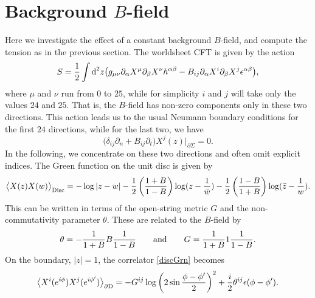 \documentclass[letterpaper,12pt]{article}
\newcommand{\td}{\textup{d}}
\begin{document}

\newcommand{\kn}{k_\sharp}
\newcommand{\kb}{k_\flat}

\section{Background $B$-field}
\label{Bfield}

Here we investigate the effect of a constant background $B$-field, and compute
the tension as in the previous section.
The worldsheet CFT is given by the action~\cite{SW}
\begin{equation}
\label{Baction}
S=\frac12\int \td^2z \big(g_{\mu\nu}\partial_\alpha X^\mu\partial_\beta X^\nu h^{\alpha\beta}
    -B_{ij}\partial_\alpha X^i\partial_\beta X^j \epsilon^{\alpha\beta}
    \big)
,\end{equation}
where $\mu$ and $\nu$ run from $0$ to $25$, while for simplicity $i$ and $j$ will
take only the values $24$ and $25$. That is, the $B$-field has non-zero components only
in these two directions.
This action leads us to the usual Neumann boundary conditions for the first $24$ directions, while for the last two, we have
\begin{equation}
\label{ncbc} 
\big(\delta_{ij}\partial_n + B_{ij}\partial_t \big)X^j(z)\bigg|_{\partial\Sigma}=0
.\end{equation}
In the following, we concentrate on these two directions and often omit explicit indices.
The Green function on the unit disc is given by
\begin{equation}
\label{discGrn}
\big\langle X(z)X(w) \big\rangle_{\textup{Disc}} = -\log |z-w|
   -\frac12\left(\frac{1+B}{1-B}\right)\log (z-\frac1{\bar{w}})
   -\frac12\left(\frac{1-B}{1+B}\right)\log ({\bar{z}}-\frac1w)
.\end{equation}
This can be written \cite{SW} in terms of the open-string metric $G$ and the 
non-commutativity parameter $\theta$. These are related to the $B$-field by 
\begin{equation}
\label{GB}
\theta=-\frac1{1+B} B \frac1{1-B} \qquad \textup{and} \qquad G=\frac1{1+B}1\frac1{1-B}
.\end{equation}
On the boundary, $|z|=1$, the correlator \eqref{discGrn} becomes
\begin{equation}
\big\langle X^i(e^{i\phi})X^j(e^{i\phi'}) \big\rangle_{\partial\textup{D}} = 
   -G^{ij}\log \left(2\sin\frac{\phi-\phi'}2\right)^2 + \frac{i}2 \theta^{ij} \epsilon(\phi-\phi')
.\end{equation}
\end{document}
